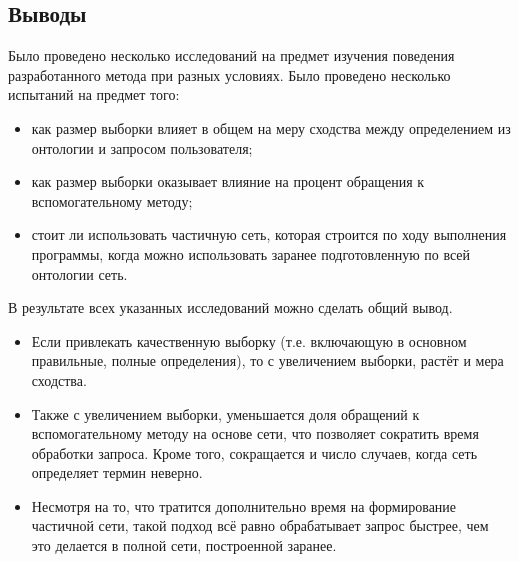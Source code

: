 \subsection*{Выводы}
Было проведено несколько исследований на предмет изучения поведения разработанного метода при разных условиях.
Было проведено несколько испытаний на предмет того:
\begin{itemize}
	\item как размер выборки влияет в общем на меру сходства между определением из онтологии и запросом пользователя;
	
	\item как размер выборки оказывает влияние на процент обращения к вспомогательному методу;
	
	\item стоит ли использовать частичную сеть, которая строится по ходу выполнения программы, когда можно использовать заранее подготовленную по всей онтологии сеть. \\
\end{itemize}
%
В результате всех указанных исследований можно сделать общий вывод.
\begin{itemize}
	\item Если привлекать качественную выборку (т.е. включающую в основном правильные, полные определения), то с увеличением выборки, растёт и мера сходства.
	
	\item Также с увеличением выборки, уменьшается доля обращений к вспомогательному методу на основе сети, что позволяет сократить время обработки запроса. Кроме того, сокращается и число случаев, когда сеть определяет термин неверно.
	
	\item Несмотря на то, что тратится дополнительно время на формирование частичной сети, такой подход всё равно обрабатывает запрос быстрее, чем это делается в полной сети, построенной заранее.
\end{itemize}